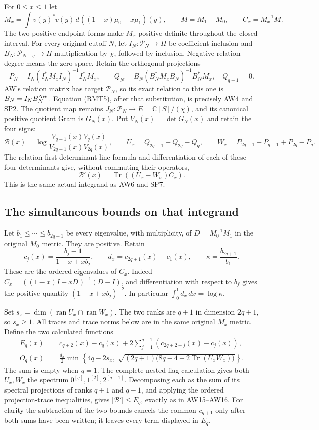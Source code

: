 For \(0\leq x\leq1\) let
\[
 M_x=\int v(y)^*v(y)\,d((1-x)\mu_0+x\mu_1)(y),\qquad
 \dot M=M_1-M_0,\qquad C_x=M_x^{-1}\dot M.
 \tag{RMT4}
\]
The two positive endpoint forms make \(M_x\) positive definite
throughout the closed interval.  For every original cutoff \(N\),
let \(I_N:\mathcal P_N\to H\) be coefficient inclusion and
\(B_N:\mathcal P_{N-q}\to H\) multiplication by \(\chi\), followed
by inclusion.  Negative relation degree means the zero space.
Retain the orthogonal projections
\[
 P_N=I_N(I_N^*M_xI_N)^{-1}I_N^*M_x,\qquad
 Q_N=B_N(B_N^*M_xB_N)^{-1}B_N^*M_x,\quad Q_{q-1}=0.
 \tag{RMT5}
\]
AW's relation matrix has target \(\mathcal P_N\), so its exact
relation to this one is \(B_N=I_N B_N^{\rm AW}\).
Equation (RMT5), after that substitution, is precisely AW4 and SP2.
The quotient map remains \(J_N:\mathcal P_N\to E=\mathbb C[S]/(\chi)\),
and its canonical positive quotient Gram is \(G_N(x)\).
Put \(V_N(x)=\det G_N(x)\) and retain the four signs:
\[
 \mathcal B(x)=\log\frac{V_{q-1}(x)V_q(x)}
                              {V_{2q-1}(x)V_{2q}(x)},\qquad
 U_x=Q_{2q-1}+Q_{2q}-Q_q,\qquad
 W_x=P_{2q-1}-P_{q-1}+P_{2q}-P_q.
 \tag{RMT6}
\]
The relation-first determinant-line formula and differentiation of
each of these four determinants give, without commuting their
operators,
\[
 \mathcal B'(x)=\operatorname{Tr}((U_x-W_x)C_x).
 \tag{RMT7}
\]
This is the same actual integrand as AW6 and SP7.

\subsection{The simultaneous bounds on that integrand}

Let \(b_1\leq\cdots\leq b_{2q+1}\) be every eigenvalue, with
multiplicity, of \(D=M_0^{-1}M_1\) in the original \(M_0\) metric.
They are positive.  Retain
\[
 c_j(x)=\frac{b_j-1}{1-x+xb_j},\qquad
 d_x=c_{2q+1}(x)-c_1(x),\qquad
 \kappa=\frac{b_{2q+1}}{b_1}.
 \tag{RMT8}
\]
These are the ordered eigenvalues of \(C_x\).  Indeed
\(C_x=((1-x)I+xD)^{-1}(D-I)\), and differentiation with
respect to \(b_j\) gives the positive quantity
\((1-x+xb_j)^{-2}\).  In particular
\(\int_0^1d_x\,dx=\log\kappa\).

Set \(s_x=\dim(\operatorname{ran}U_x\cap\operatorname{ran}W_x)\).
The two ranks are \(q+1\) in dimension \(2q+1\), so \(s_x\geq1\).
All traces and trace norms below are in the same original \(M_x\)
metric.  Define the two calculated functions
\[
 \begin{split}
 E_q(x)&=c_{q+2}(x)-c_q(x)
       +2\sum_{j=1}^{q-1}(c_{2q+2-j}(x)-c_j(x)),\\
 O_q(x)&=\frac{d_x}{2}\min\left\{
 4q-2s_x,\
 \sqrt{(2q+1)\bigl(8q-4-2\operatorname{Tr}(U_xW_x)\bigr)}
 \right\}.
 \end{split}
 \tag{RMT9}
\]
The sum is empty when \(q=1\).
The complete nested-flag calculation gives both \(U_x,W_x\)
the spectrum \(0^{[q]},1^{[2]},2^{[q-1]}\).  Decomposing each
as the sum of its spectral projections of ranks \(q+1\) and
\(q-1\), and applying the ordered projection-trace inequalities,
gives \(|\mathcal B'|\leq E_q\), exactly as in AW15--AW16.
For clarity the subtraction of the two bounds cancels the
common \(c_{q+1}\) only after both sums have been written; it
leaves every term displayed in \(E_q\).

